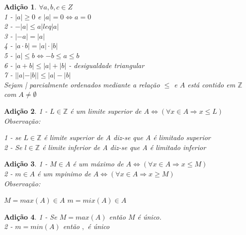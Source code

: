 \documentclass[a4paper,12pt]{article}
\newtheorem{add_int}{Adição}
\begin{document}
\begin{add_int} %
  $\forall a, b,c \in Z$\\

  1 - $|a| \ge 0 $ e $|a| = 0 \iff a = 0$\\
  2 - $-|a| \leq a |leq |a|$\\
  3 - $|-a| = |a|$\\
  4 - $|a \cdot b| = |a|\cdot|b|$\\
  5 - $|a| \leq b  \iff -b \leq a \leq b$\\
  6 - $|a + b| \leq |a| + |b|$ - desigualdade triangular\\
  7 - $ ||a| - |b|| \leq |a| - |b|$\\

  Sejam | parcialmente ordenados mediante a relação $\leq$ e $A $ está contido em $\mathbb{Z}$ com $A \neq \emptyset$
\end{add_int}

\begin{add_int} %
  1 - $L \in \mathbb{Z}$ é  um limite superior de $A  \iff (\forall x \in A \Longrightarrow x \leq L) $\\

Observação:

1 - se $L \in \mathbb{Z}$ é limite superior de A diz-se que A é limitado superior\\
2 - Se $l \in \mathbb{Z}$ é limite inferior de A diz-se que A é limitado inferior\\
\end{add_int}

\begin{add_int} %
  1 - $M \in A$ é um máximo de $A  \iff (\forall x \in A \Longrightarrow x \leq M) $\\
  2 - $m \in A$ é um mpinimo de $A \iff (\forall x \in A \Longrightarrow x \geq M) $ \\

  Observação:
  
  $M = max(A) \in A$
  $m = mix(A) \in A$
\end{add_int}

\begin{add_int} %
  1 - Se $M = max(A)$ então $M$ é único.\\
  2 - $m  = min(A)$ então $,$ é único \\
\end{add_int}
\end{document}
